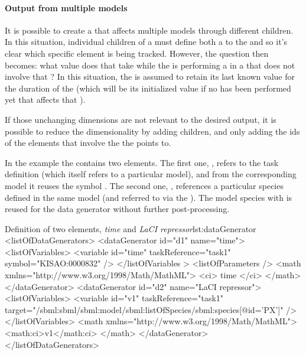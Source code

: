 \begin{blockChanged}
\paragraph*{Output from multiple models}
\label{sec:multiModelOutput}
It is possible to create a \RepeatedTask that affects multiple models through different \SubTask children.  In this situation, individual \Variable children of a \DataGenerator must define both a  to the \RepeatedTask and  so it's clear which specific element is being tracked.  However, the question then becomes: what value does that \Variable take while the \RepeatedTask is performing a \Simulation in a \SubTask that does not involve that \Model?  In this situation, the \Variable is assumed to retain its last known value for the duration of the \Simulation (which will be its initialized value if no \Simulation has been performed yet that affects that \Variable).

If those unchanging dimensions are not relevant to the desired output, it is possible to reduce the dimensionality by adding \RemainingDimension children, and only adding the ids of the \Task elements that involve the \Model the \Variable points to.

\end{blockChanged}


In the example the  contains two  elements. 
The first one, , refers to the task definition  (which itself refers to a particular model), and from the corresponding model it reuses the symbol . The second one, , references a particular species defined in the same model (and referred to via the ). The model species with   is reused for the data generator  without further post-processing.
\begin{myXmlLst}{Definition of two  elements, \emph{time} and \emph{LaCI repressor}}{lst:dataGenerator}
<listOfDataGenerators>
	<dataGenerator id="d1" name="time">
		<listOfVariables>
			<variable id="time" taskReference="task1" symbol="KISAO:0000832" />
		</listOfVariables >
		<listOfParameters />
		<math xmlns="http://www.w3.org/1998/Math/MathML">
			<ci> time </ci>
		</math>
	</dataGenerator>
	<dataGenerator id="d2" name="LaCI repressor">
		<listOfVariables>
			<variable id="v1" taskReference="task1" 
				target="/sbml:sbml/sbml:model/sbml:listOfSpecies/sbml:species[@id='PX']" />
		</listOfVariables>
		<math xmlns="http://www.w3.org/1998/Math/MathML">
			<math:ci>v1</math:ci>
		</math>
	</dataGenerator>
</listOfDataGenerators>
\end{myXmlLst}
